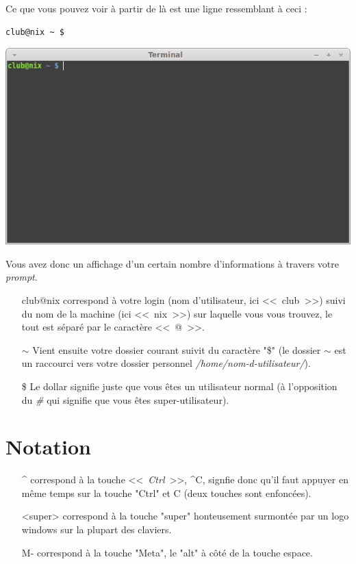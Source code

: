 \documentclass[french, a4paper, 12pt, titlepage]{article}
\begin{document}
Ce que vous pouvez voir à partir de là est une ligne ressemblant à ceci :
\begin{lstlisting}
club@nix ~ $
\end{lstlisting}
\begin{center}
\includegraphics[scale=0.42]{Images/terminal}
\end{center}
Vous avez donc un affichage d'un certain nombre d'informations à travers votre \emph{prompt}.
\begin{enumerate}
\item[club@nix] correspond à votre login (nom d'utilisateur, ici <<~club~>>) suivi du nom de la machine (ici <<~nix~>>) sur laquelle vous vous trouvez, le tout est séparé par le caractère <<~@~>>.
\item[$\sim$] Vient ensuite votre dossier courant suivit du caractère "\$" (le dossier $\sim$ est un raccourci vers votre dossier personnel \emph{/home/nom-d-utilisateur/}).
\item[\$] Le dollar signifie juste que vous êtes un utilisateur normal (à l'opposition du \emph{\#} qui signifie que vous êtes super-utilisateur).
\end{enumerate}

\part{Notation}

\begin{enumerate}
\item[\^{}] correspond à la touche <<~\emph{Ctrl}~>>, \^{}C, signfie donc qu'il faut appuyer en même temps sur la touche "Ctrl" et C (deux touches sont enfoncées).
\item [<super>] correspond à la touche "super" honteusement surmontée par un logo windows sur la plupart des claviers.
\item [M-] correspond à la touche "Meta", le "alt" à côté de la touche espace.
\end{enumerate}
\end{document}
